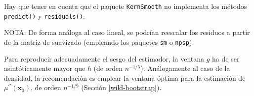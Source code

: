 \documentclass[
]{book}
\newenvironment{Shaded}{\begin{snugshade}}{\end{snugshade}}
\newcommand{\CommentTok}[1]{\textcolor[rgb]{0.56,0.35,0.01}{\textit{#1}}}
\newcommand{\DataTypeTok}[1]{\textcolor[rgb]{0.13,0.29,0.53}{#1}}
\newcommand{\KeywordTok}[1]{\textcolor[rgb]{0.13,0.29,0.53}{\textbf{#1}}}
\newcommand{\NormalTok}[1]{#1}
\newcommand{\OperatorTok}[1]{\textcolor[rgb]{0.81,0.36,0.00}{\textbf{#1}}}
\newcommand{\StringTok}[1]{\textcolor[rgb]{0.31,0.60,0.02}{#1}}
\theoremstyle{definition}
\theoremstyle{definition}
\theoremstyle{definition}
\theoremstyle{remark}
\begin{document}
Hay que tener en cuenta que el paquete \texttt{KernSmooth} no implementa los métodos
\texttt{predict()} y \texttt{residuals()}:

\begin{Shaded}
\end{Shaded}

NOTA: De forma análoga al caso lineal, se podrían reescalar los residuos
a partir de la matriz de suavizado (empleando los paquetes \texttt{sm} o \texttt{npsp}).

Para reproducir adecuadamente el sesgo del estimador, la ventana \(g\) ha de ser asintóticamente mayor que \(h\) (de orden \(n^{-1/5}\)).
Análogamente al caso de la densidad, la recomendación es emplear la ventana
óptima para la estimación de \(\mu^{\prime \prime }\left( \mathbf{x}_0 \right)\),
de orden \(n^{-1/9}\) (Sección \ref{wild-bootstrap}).
\end{document}
